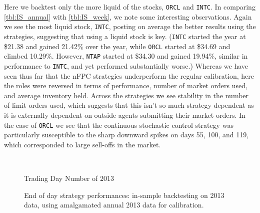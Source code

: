 Here we backtest only the more liquid of the stocks, \texttt{ORCL} and \texttt{INTC}. In comparing \autoref{tbl:IS_annual} with \autoref{tbl:IS_week}, we note some interesting observations. Again we see the most liquid stock, \texttt{INTC}, posting on average the better results using the strategies, suggesting that using a liquid stock is key.  (\texttt{INTC} started the year at \$21.38 and gained 21.42\% over the year, while \texttt{ORCL} started at \$34.69 and climbed 10.29\%. However, \texttt{NTAP} started at \$34.30 and gained 19.94\%, similar in performance to \texttt{INTC}, and yet performed substantially worse.) Whereas we have seen thus far that the nFPC strategies underperform the regular calibration, here the roles were reversed in terms of performance, number of market orders used, and average inventory held. Across the strategies we see stability in the number of limit orders used, which suggests that this isn't so much strategy dependent as it is externally dependent on outside agents submitting their market orders. In the case of \texttt{ORCL} we see that the continuous stochastic control strategy was particularly susceptible to the sharp downward spikes on days 55, 100, and 119, which corresponded to large sell-offs in the market. 


\begin{figure}
\centering
\begin{subfigure}{.45\linewidth}
  \centering
  \setlength\figureheight{\linewidth} 
  \setlength\figurewidth{\linewidth}
  
\end{subfigure}%
\hfill%
\begin{subfigure}{.45\linewidth}
  \centering
  \setlength\figureheight{\linewidth} 
  \setlength\figurewidth{\linewidth}
   
\end{subfigure}\\

\leavevmode{}\hspace{0pt plus 1filll}\null

Trading Day Number of 2013

\vspace{1cm}
\begin{subfigure}{\linewidth}
  \setlength\figureheight{\linewidth} 
  \setlength\figurewidth{\linewidth}
  \resizebox{\linewidth}{!}{}
\end{subfigure}%
  \caption[In-sample backtesting performance using annual calibration]{End of day strategy performances: in-sample backtesting on 2013 data, using amalgamated annual 2013 data for calibration.}
  \label{fig:IS_annual_comp}
\end{figure}

